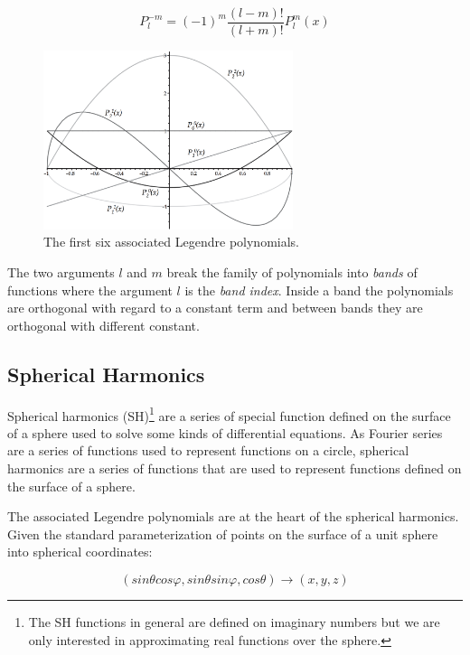 \begin{equation*}
	P_{l}^{-m}=(-1)^{m}\frac{(l-m)!}{(l+m)!}P^{m}_{l}(x)
\end{equation*}

\begin{figure}
\sidecaption
	\includegraphics[width=0.65\textwidth]{graphics/prt/prt-5}
	\caption{The first six associated Legendre polynomials.}
\end{figure}

The two arguments $l$ and $m$ break the family of polynomials into \textit{bands} of functions where the argument $l$ is the \textit{band index}. Inside a band the polynomials are orthogonal with regard to a constant term and between bands they are orthogonal with different constant.



\subsection{Spherical Harmonics}
Spherical harmonics (SH)\footnote{The SH functions in general are defined on imaginary numbers but we are only interested in approximating real functions over the sphere.} are a series of special function defined on the surface of a sphere used to solve some kinds of differential equations. As Fourier series are a series of functions used to represent functions on a circle, spherical harmonics are a series of functions that are used to represent functions defined on the surface of a sphere.

The associated Legendre polynomials are at the heart of the spherical harmonics. Given the standard parameterization of points on the surface of a unit sphere into spherical coordinates:

\begin{equation*}
	(sin\theta cos\varphi,sin\theta sin\varphi,cos\theta)\to(x,y,z)
\end{equation*}


